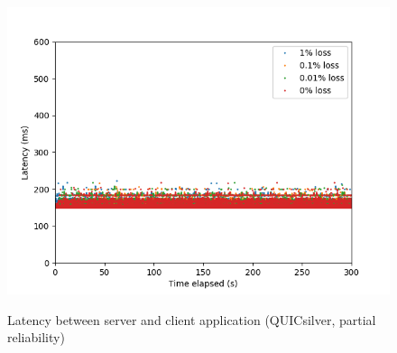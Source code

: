 \documentclass{mpaper}
\begin{document}
\begin{figure}
{   \includegraphics[scale=0.5]{images/graphics-partial/150ms-app-latencies-combined-PARTIAL.png}
   \label{app-par-150}
 }
 \caption{Latency between server and client application (QUICsilver, partial reliability)}
 \label{app-par}
\end{figure}
\end{document}
